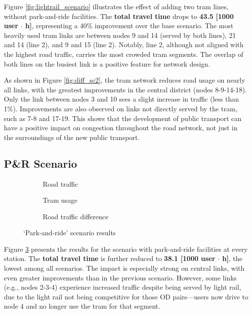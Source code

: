 Figure \ref{fig:lightrail_scenario} illustrates the effect of adding two tram lines, without park-and-ride facilities. The \textbf{total travel time} drops to \textbf{43.5 [1000 user $\cdot$ h]}, representing a 40\% improvement over the base scenario. The most heavily used tram links are between nodes 9 and 14 (served by both lines), 21 and 14 (line 2), and 9 and 15 (line 2). Notably, line 2, although not aligned with the highest road traffic, carries the most crowded tram segments. The overlap of both lines on the busiest link is a positive feature for network design.

As shown in Figure \ref{fig:diff_sc2}, the tram network reduces road usage on nearly all links, with the greatest improvements in the central district (nodes 8-9-14-18). Only the link between nodes 3 and 10 sees a slight increase in traffic (less than 1\%). Improvements are also observed on links not directly served by the tram, such as 7-8 and 17-19. This shows that the development of public transport can have a positive impact on congestion throughout the road network, not just in the surroundings of the new public transport.

\subsection{P\&R Scenario}

\begin{figure}
    \centering
    \begin{subfigure}{0.33\textwidth}
        \centering
        \resizebox{\textwidth}{!}{}
        \caption{Road traffic}
    \end{subfigure}%
    \begin{subfigure}{0.33\textwidth}
        \centering
        \resizebox{\textwidth}{!}{}
        \caption{Tram usage}
        \label{fig:tram_sc3}
    \end{subfigure}%
    \begin{subfigure}{0.33\textwidth}
        \centering
        \resizebox{\textwidth}{!}{}
        \caption{Road traffic difference}
        \label{fig:diff_sc3}
    \end{subfigure}
    \caption{`Park-and-ride' scenario results}
    \label{fig:pnr_scenario}
\end{figure}

Figure \ref{fig:pnr_scenario} presents the results for the scenario with park-and-ride facilities at every station. The \textbf{total travel time} is further reduced to \textbf{38.1 [1000 user $\cdot$ h]}, the lowest among all scenarios. The impact is especially strong on central links, with even greater improvements than in the previous scenario. However, some links (e.g., nodes 2-3-4) experience increased traffic despite being served by light rail, due to the light rail not being competitive for those OD pairs—users now drive to node 4 and no longer use the tram for that segment.

